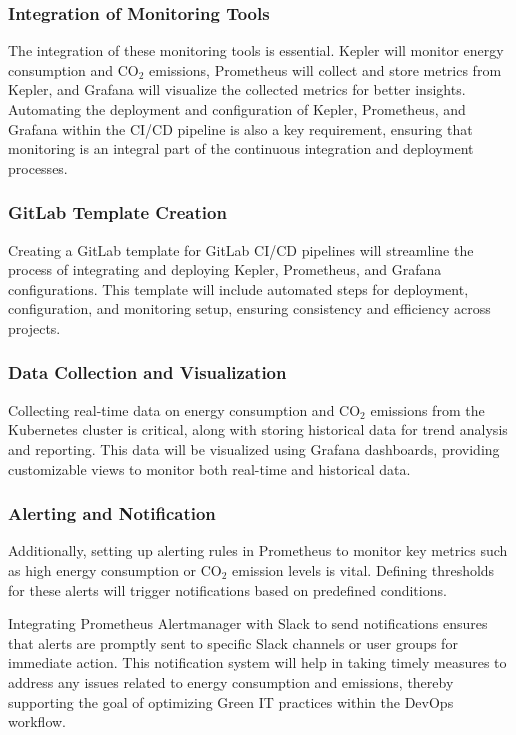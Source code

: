 \subsubsection*{Integration of Monitoring Tools}

The integration of these monitoring tools is essential. Kepler will monitor energy consumption and CO$_2$ emissions, Prometheus will collect and store metrics from Kepler, and Grafana will visualize the collected metrics for better insights. Automating the deployment and configuration of Kepler, Prometheus, and Grafana within the CI/CD pipeline is also a key requirement, ensuring that monitoring is an integral part of the continuous integration and deployment processes.

\subsubsection*{GitLab Template Creation}

Creating a GitLab template for GitLab CI/CD pipelines will streamline the process of integrating and deploying Kepler, Prometheus, and Grafana configurations. This template will include automated steps for deployment, configuration, and monitoring setup, ensuring consistency and efficiency across projects.


\subsubsection*{Data Collection and Visualization}

Collecting real-time data on energy consumption and CO$_2$ emissions from the Kubernetes cluster is critical, along with storing historical data for trend analysis and reporting. This data will be visualized using Grafana dashboards, providing customizable views to monitor both real-time and historical data.

\subsubsection*{Alerting and Notification}

Additionally, setting up alerting rules in Prometheus to monitor key metrics such as high energy consumption or CO$_2$ emission levels is vital. Defining thresholds for these alerts will trigger notifications based on predefined conditions.

Integrating Prometheus Alertmanager with Slack to send notifications ensures that alerts are promptly sent to specific Slack channels or user groups for immediate action. This notification system will help in taking timely measures to address any issues related to energy consumption and emissions, thereby supporting the goal of optimizing Green IT practices within the DevOps workflow.



